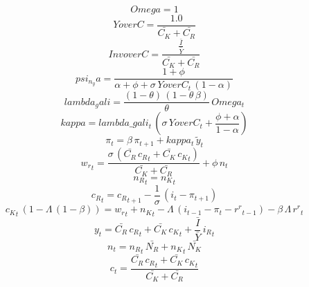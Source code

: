 \documentclass[10pt,a4paper]{article}
\begin{document}
\footnotesize
\begin{dmath*}
Omega = 1
\end{dmath*}
\begin{dmath*}
YoverC = \frac{1.0}{\bar{C_K}+\bar{C_R}}
\end{dmath*}
\begin{dmath*}
InvoverC = \frac{{\frac{\bar{I}}{\bar{Y}}}}{\bar{C_K}+\bar{C_R}}
\end{dmath*}
\begin{dmath*}
psi_n_ya = \frac{1+{\phi}}{{\alpha}+{\phi}+{\sigma}\, YoverC_{t}\, \left(1-{\alpha}\right)}
\end{dmath*}
\begin{dmath*}
lambda_gali = \frac{\left(1-{\theta}\right)\, \left(1-{\theta}\, {\beta}\right)}{{\theta}}\, Omega_{t}
\end{dmath*}
\begin{dmath*}
kappa = lambda\_gali_{t}\, \left({\sigma}\, YoverC_{t}+\frac{{\phi}+{\alpha}}{1-{\alpha}}\right)
\end{dmath*}
\begin{dmath}
{\pi}_{t}={\beta}\, {\pi}_{t+1}+kappa_{t}\, {\tilde y}_{t}
\end{dmath}
\begin{dmath}
{w_r}_{t}=\frac{{\sigma}\, \left(\bar{C_R}\, {c_R}_{t}+\bar{C_K}\, {c_K}_{t}\right)}{\bar{C_K}+\bar{C_R}}+{\phi}\, {n}_{t}
\end{dmath}
\begin{dmath}
{n_R}_{t}={n_K}_{t}
\end{dmath}
\begin{dmath}
{c_R}_{t}={c_R}_{t+1}-\frac{1}{{\sigma}}\, \left({i}_{t}-{\pi}_{t+1}\right)
\end{dmath}
\begin{dmath}
{c_K}_{t}\, \left(1-{\Lambda}\, \left(1-{\beta}\right)\right)={w_r}_{t}+{n_K}_{t}-{\Lambda}\, \left({i}_{t-1}-{\pi}_{t}-{r^r}_{t-1}\right)-{\beta}\, {\Lambda}\, {r^r}_{t}
\end{dmath}
\begin{dmath}
{y}_{t}=\bar{C_R}\, {c_R}_{t}+\bar{C_K}\, {c_K}_{t}+{\frac{\bar{I}}{\bar{Y}}}\, {i_R}_{t}
\end{dmath}
\begin{dmath}
{n}_{t}={n_R}_{t}\, \bar{N_R}+{n_K}_{t}\, \bar{N_K}
\end{dmath}
\begin{dmath}
{c}_{t}=\frac{\bar{C_R}\, {c_R}_{t}+\bar{C_K}\, {c_K}_{t}}{\bar{C_K}+\bar{C_R}}
\end{dmath}
\end{document}
